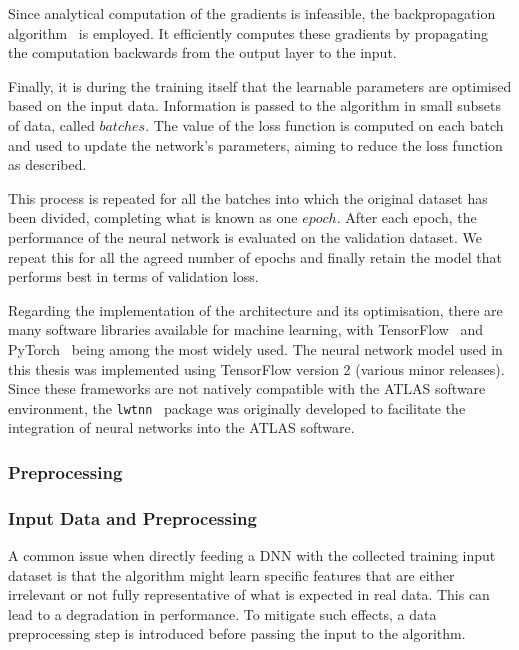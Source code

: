 Since analytical computation of the gradients is infeasible, the backpropagation algorithm~\cite{Rumelhart1986LearningRB} is employed. It efficiently computes these gradients by propagating the computation backwards from the output layer to the input.

Finally, it is during the training itself that the learnable parameters are optimised based on the input data. Information is passed to the algorithm in small subsets of data, called $batches$. The value of the loss function is computed on each batch and used to update the network's parameters, aiming to reduce the loss function as described.

This process is repeated for all the batches into which the original dataset has been divided, completing what is known as one $epoch$. After each epoch, the performance of the neural network is evaluated on the validation dataset. We repeat this for all the agreed number of epochs and finally retain the model that performs best in terms of validation loss.

Regarding the implementation of the architecture and its optimisation, there are many software libraries available for machine learning, with TensorFlow~\cite{tensorflow2015} and PyTorch~\cite{pytorch} being among the most widely used. The neural network model used in this thesis was implemented using TensorFlow version 2 (various minor releases). Since these frameworks are not natively compatible with the ATLAS software environment, the \texttt{lwtnn}~\cite{lwtnn,lwtnn2} package was originally developed to facilitate the integration of neural networks into the ATLAS software.

\subsubsection{Preprocessing}

\subsubsection{Input Data and Preprocessing}
\label{dnn:preprocessing}

A common issue when directly feeding a DNN with the collected training input dataset is that the algorithm might learn specific features that are either irrelevant or not fully representative of what is expected in real data. This can lead to a degradation in performance. To mitigate such effects, a data preprocessing step is introduced before passing the input to the algorithm.

